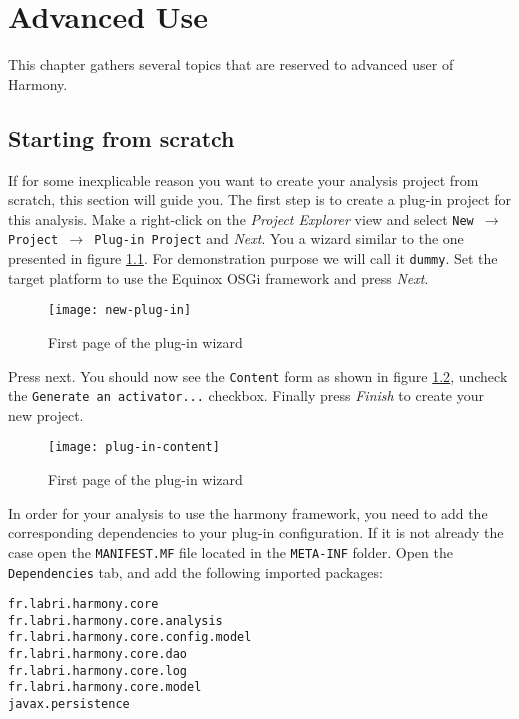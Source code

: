\chapter{Advanced Use}\label{chap:advUse}

This chapter gathers several topics that are reserved to advanced user of Harmony. 

\section{Starting from scratch}\label{newAnalysis:fromScratch}

If for some inexplicable reason you want to create your analysis project from scratch, this section will guide you. The first step is to create a plug-in project for this analysis. Make a right-click on the \emph{Project Explorer} view and select \texttt{New $\rightarrow$ Project $\rightarrow$ Plug-in Project} and \emph{Next}. You a wizard similar to the one presented in figure \ref{fig:new-plug-in}. For demonstration purpose we will call it \texttt{dummy}. Set the target platform to use the Equinox OSGi framework and press \emph{Next}.

	\begin{figure}[H]
		\centering
		\texttt{[image: new-plug-in]}
		\caption{First page of the plug-in wizard}
		\label{fig:new-plug-in}
	\end{figure}
	
Press next. You should now see the \texttt{Content} form as shown in figure \ref{fig:plug-in-content}, uncheck the \texttt{Generate an activator...} checkbox. Finally press \emph{Finish} to create your new project.

	\begin{figure}[H]
		\centering
		\texttt{[image: plug-in-content]}
		\caption{First page of the plug-in wizard}
		\label{fig:plug-in-content}
	\end{figure}

In order for your analysis to use the harmony framework, you need to add the corresponding dependencies to your plug-in configuration. If it is not already the case open the \texttt{MANIFEST.MF} file located in the \texttt{META-INF} folder. Open the \texttt{Dependencies} tab, and add the following imported packages:

\begin{lstlisting}
fr.labri.harmony.core
fr.labri.harmony.core.analysis
fr.labri.harmony.core.config.model
fr.labri.harmony.core.dao
fr.labri.harmony.core.log
fr.labri.harmony.core.model
javax.persistence
\end{lstlisting}

